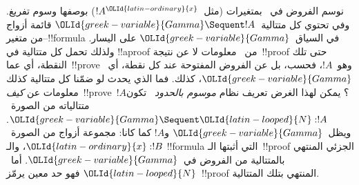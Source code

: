 \documentclass[../../../include/open-logic-section]{subfiles}
\begin{document}


نوسم الفروض في~ بمتغيرات (مثل~$!A^\OLId{latin-ordinary}{x}$) بوصفها وسوم تفريغ. وفي
 تحتوي كل متتالية~$\OLId{greek-variable}{Gamma}\Sequent !A$ قائمة أزواج من
متغير--!!{formula} في السياق~$\OLId{greek-variable}{Gamma}$ على اليسار. ولذلك تحمل كل متتالية في
!!a{proof} من~ معلومات لا عن نتيجة~!!{proof} حتى تلك النقطة، أي
عما~!!{prove} وهو~$!A$، فحسب، بل عن الفروض المفتوحة عند كل نقطة،
أي~$\OLId{greek-variable}{Gamma}$، كذلك. فما الذي يحدث لو ضمّنا كل متتالية كذلك معلومات عن
\emph{كيف}~!!{prove}~$!A$؟ يمكن لهذا الغرض تعريف نظام \emph{موسوم
بالحدود}~ تكون متتالياته من الصورة~$\OLId{greek-variable}{Gamma}\Sequent \OLId{latin-looped}{N}:!A$.
ويظل~$\OLId{greek-variable}{Gamma}$ و$!A$ كما كانا: مجموعة أزواج من الصورة~$\OLId{latin-ordinary}{x}:!B$، والـ
!!{formula} التي أثبتها الـ~!!{proof} الجزئي المنتهي بالمتتالية من الفروض
في~$\OLId{greek-variable}{Gamma}$. أما~$\OLId{latin-looped}{N}$ فهو حد معين يرمّز~!!{proof} المنتهي بتلك المتتالية.
\end{document}
